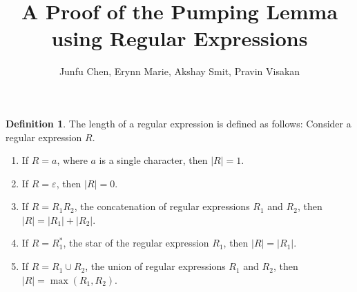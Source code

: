\documentclass[11pt]{article}
\theoremstyle{definition}
\newtheorem*{definition}{Definition}
\begin{document}
\author{Junfu Chen, Erynn Marie, Akshay Smit, Pravin Visakan}
\title{A Proof of the Pumping Lemma using Regular Expressions}
\maketitle

\medskip

\begin{definition}
The length of a regular expression is defined as follows: Consider a regular expression $R$.
\begin{enumerate}
\item If $R = a$, where $a$ is a single character, then $|R| = 1$.
\item If $R = \varepsilon$, then $|R| = 0$. 
\item If $R = R_1R_2$, the concatenation of regular expressions $R_1$ and $R_2$, then $|R| = |R_1| + |R_2|$.
\item If $R = R_1^*$, the star of the regular expression $R_1$, then $|R| = |R_1|$. 
\item If $R = R_1 \cup R_2$, the union of regular expressions $R_1$ and $R_2$, then $|R| = \max(R_1, R_2)$.
\end{enumerate}
\end{definition}
\end{document}
